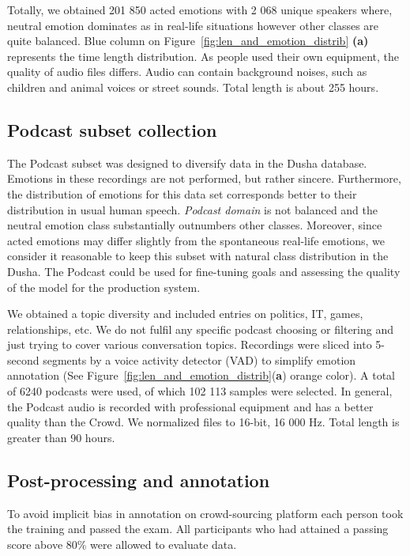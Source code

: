 \documentclass{article}
\begin{document}
Totally, we obtained 201 850 acted emotions with 2 068 unique speakers where, neutral emotion dominates as in real-life situations however other classes are quite balanced. Blue column on Figure~\ref{fig:len_and_emotion_distrib} \textbf{(a)} represents the time length distribution. As people used their own equipment, the quality of audio files differs. Audio can contain background noises, such as children and animal voices or street sounds. Total length is about 255 hours.


\subsection{Podcast subset collection}
The Podcast subset was designed to diversify data in the Dusha database. Emotions in these recordings are not performed, but rather sincere. Furthermore, the distribution of emotions for this data set corresponds better to their distribution in usual human speech. \textit{Podcast domain} is not balanced and the neutral emotion class substantially outnumbers other classes. Moreover, since acted emotions may differ slightly from the spontaneous real-life emotions, we consider it reasonable to keep this subset with natural class distribution in the Dusha. The Podcast could be used for fine-tuning goals and assessing the quality of the model for the production system. 

We obtained a topic diversity and included entries on politics, IT, games, relationships, etc. We do not fulfil any specific podcast choosing or filtering and just trying to cover various conversation topics. Recordings were sliced into 5-second segments by a voice activity detector (VAD) to simplify emotion annotation (See Figure~\ref{fig:len_and_emotion_distrib}(\textbf{a}) orange color). A total of 6240 podcasts were used, of which 102 113 samples were selected. In general, the Podcast audio is recorded with professional equipment and has a better quality than the Crowd. We normalized files to 16-bit, 16 000 Hz. 
Total length is greater than 90 hours.



\subsection{Post-processing and annotation}
To avoid implicit bias in annotation on crowd-sourcing platform each person took the training and passed the exam. All participants who had attained a passing score above 80\% were allowed to evaluate data.
\end{document}
